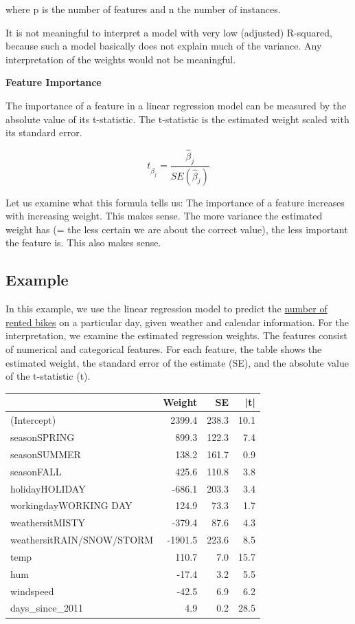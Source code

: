 \documentclass[
  10pt,
]{scrbook}
\begin{document}
where p is the number of features and n the number of instances.

It is not meaningful to interpret a model with very low (adjusted) R-squared, because such a model basically does not explain much of the variance.
Any interpretation of the weights would not be meaningful.

\textbf{Feature Importance}

The importance of a feature in a linear regression model can be measured by the absolute value of its t-statistic.
The t-statistic is the estimated weight scaled with its standard error.

\[t_{\hat{\beta}_j}=\frac{\hat{\beta}_j}{SE(\hat{\beta}_j)}\]

Let us examine what this formula tells us:
The importance of a feature increases with increasing weight.
This makes sense.
The more variance the estimated weight has (= the less certain we are about the correct value), the less important the feature is.
This also makes sense.

\hypertarget{example}{%
\subsection{Example}\label{example}}

In this example, we use the linear regression model to predict the \protect\hyperlink{bike-data}{number of rented bikes} on a particular day, given weather and calendar information.
For the interpretation, we examine the estimated regression weights.
The features consist of numerical and categorical features.
For each feature, the table shows the estimated weight, the standard error of the estimate (SE), and the absolute value of the t-statistic (\textbar t\textbar).

\begin{table}
\centering
\begin{tabular}{lrrr}
\toprule
  & Weight & SE & |t|\\
\midrule
(Intercept) & 2399.4 & 238.3 & 10.1\\
seasonSPRING & 899.3 & 122.3 & 7.4\\
seasonSUMMER & 138.2 & 161.7 & 0.9\\
seasonFALL & 425.6 & 110.8 & 3.8\\
holidayHOLIDAY & -686.1 & 203.3 & 3.4\\
\addlinespace
workingdayWORKING DAY & 124.9 & 73.3 & 1.7\\
weathersitMISTY & -379.4 & 87.6 & 4.3\\
weathersitRAIN/SNOW/STORM & -1901.5 & 223.6 & 8.5\\
temp & 110.7 & 7.0 & 15.7\\
hum & -17.4 & 3.2 & 5.5\\
\addlinespace
windspeed & -42.5 & 6.9 & 6.2\\
days\_since\_2011 & 4.9 & 0.2 & 28.5\\
\bottomrule
\end{tabular}
\end{table}
\end{document}
